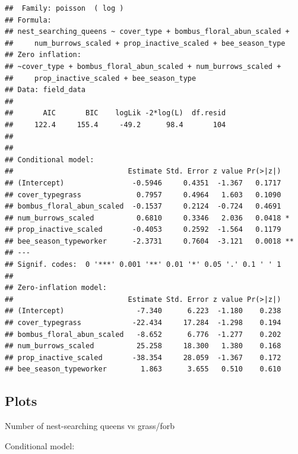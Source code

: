 \documentclass[
]{article}
\begin{document}
\begin{verbatim}
##  Family: poisson  ( log )
## Formula:          
## nest_searching_queens ~ cover_type + bombus_floral_abun_scaled +  
##     num_burrows_scaled + prop_inactive_scaled + bee_season_type
## Zero inflation:                         
## ~cover_type + bombus_floral_abun_scaled + num_burrows_scaled + 
##     prop_inactive_scaled + bee_season_type
## Data: field_data
## 
##       AIC       BIC    logLik -2*log(L)  df.resid 
##     122.4     155.4     -49.2      98.4       104 
## 
## 
## Conditional model:
##                           Estimate Std. Error z value Pr(>|z|)   
## (Intercept)                -0.5946     0.4351  -1.367   0.1717   
## cover_typegrass             0.7957     0.4964   1.603   0.1090   
## bombus_floral_abun_scaled  -0.1537     0.2124  -0.724   0.4691   
## num_burrows_scaled          0.6810     0.3346   2.036   0.0418 * 
## prop_inactive_scaled       -0.4053     0.2592  -1.564   0.1179   
## bee_season_typeworker      -2.3731     0.7604  -3.121   0.0018 **
## ---
## Signif. codes:  0 '***' 0.001 '**' 0.01 '*' 0.05 '.' 0.1 ' ' 1
## 
## Zero-inflation model:
##                           Estimate Std. Error z value Pr(>|z|)
## (Intercept)                 -7.340      6.223  -1.180    0.238
## cover_typegrass            -22.434     17.284  -1.298    0.194
## bombus_floral_abun_scaled   -8.652      6.776  -1.277    0.202
## num_burrows_scaled          25.258     18.300   1.380    0.168
## prop_inactive_scaled       -38.354     28.059  -1.367    0.172
## bee_season_typeworker        1.863      3.655   0.510    0.610
\end{verbatim}

\subsection{Plots}\label{plots-3}

Number of nest-searching queens vs grass/forb

Conditional model:
\end{document}

